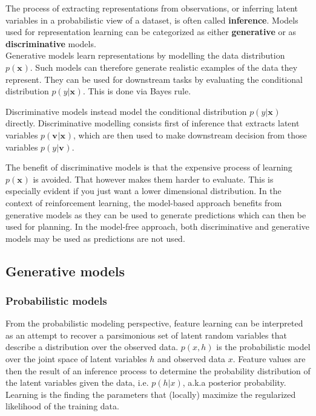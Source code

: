 The process of extracting representations from observations,
or inferring latent variables in a probabilistic view of a dataset,  is often called \textbf{inference}.
Models used for representation learning can be categorized as either \textbf{generative} or as \textbf{discriminative} models. \\

Generative models learn representations by modelling the data distribution
$ p(\bm{x}_{})  $. Such models can therefore generate realistic examples of the data they represent.
They can be used for downstream tasks by
evaluating the conditional distribution $ p (y | \bm{x}_{})  $. This is done via Bayes rule.

Discriminative models instead model the conditional distribution $ p (y | \bm{x}_{})  $
directly.
Discriminative modelling consists first of inference
that extracts latent variables
$ p(\bm{v}_{}| \bm{x}_{})  $,
which are then used to make downstream decision
from those variables $ p (y|\bm{v}_{})  $.

The benefit of discriminative models is that 
the expensive process of learning $ p (\bm{x}_{})  $ is avoided.
That however makes them harder to evaluate.
This is especially evident if you just want a lower dimensional distribution.
In the context of reinforcement learning, the model-based approach 
benefits from generative models as they can be used to generate predictions
which can then be used for planning.
In the model-free approach, both discriminative and generative models may be used
as predictions are not used.


\subsection{Generative models}
\subsubsection{Probabilistic models}
\label{subsub-probabilistic-models}
From the probabilistic modeling perspective, feature learning
can be interpreted as an attempt to recover a parsimonious set of latent random
variables that describe a distribution over the observed data.
$ p (x,h)  $ is the probabilistic model over the joint space
of latent variables $ h  $ and observed data $ x  $.
Feature values are then the result of an inference process to determine the probability
distribution of the latent variables given the data, i.e. $ p (h|x)  $,
a.k.a posterior probability.
Learning is the finding the parameters
that (locally) maximize the regularized likelihood of the training data.

